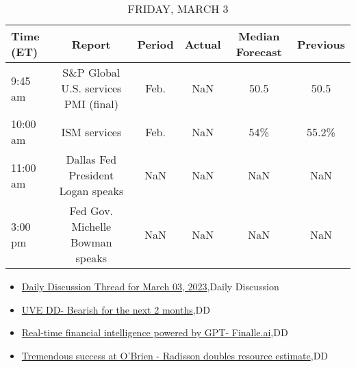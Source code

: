 \documentclass{article}%
\begin{document}
%


\begin{table}[htbp]%
\caption{FRIDAY, MARCH 3}%
\centering%
\begin{adjustbox}{width=1\textwidth}%
\begin{tabular}{lccccc}
\toprule
Time (ET) &                               Report & Period & Actual & Median Forecast & Previous \\
\midrule
  9:45 am & S\&P Global U.S. services PMI (final) &   Feb. &    NaN &            50.5 &     50.5 \\
 10:00 am &                         ISM services &   Feb. &    NaN &             54\% &    55.2\% \\
 11:00 am &    Dallas Fed President Logan speaks &    NaN &    NaN &             NaN &      NaN \\
  3:00 pm &      Fed Gov. Michelle Bowman speaks &    NaN &    NaN &             NaN &      NaN \\
\bottomrule
\end{tabular}
%
\end{adjustbox}%
\end{table}

%
\begin{itemize}%
\item%
\href{https://reddit.com/r/wallstreetbets/comments/11gxva3/daily\_discussion\_thread\_for\_march\_03\_2023/}{Daily Discussion Thread for March 03, 2023},Daily Discussion%
\item%
\href{https://reddit.com/r/wallstreetbets/comments/11gvooy/uve\_dd\_bearish\_for\_the\_next\_2\_months/}{UVE DD- Bearish for the next 2 months},DD%
\item%
\href{https://reddit.com/r/Baystreetbets/comments/11gjfv6/realtime\_financial\_intelligence\_powered\_by\_gpt/}{Real-time financial intelligence powered by GPT- Finalle.ai},DD%
\item%
\href{https://reddit.com/r/Baystreetbets/comments/11g7djb/tremendous\_success\_at\_obrien\_radisson\_doubles/}{Tremendous success at O'Brien - Radisson doubles resource estimate},DD%
\end{itemize}%
\end{document}
